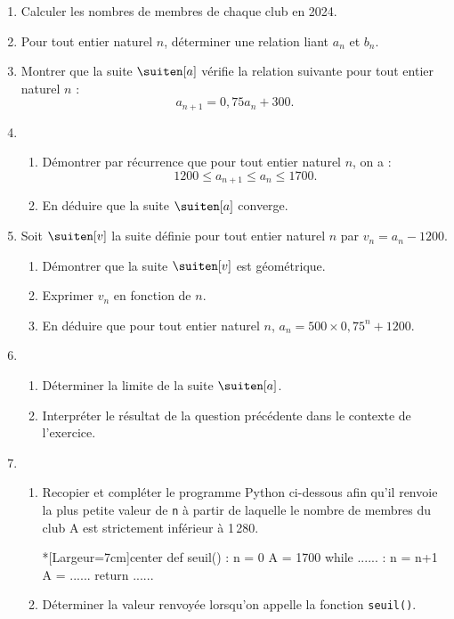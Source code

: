\begin{enumerate}
	\item Calculer les nombres de membres de chaque club en 2024.
	\item Pour tout entier naturel $n$, déterminer une relation liant $a_n$ et $b_n$.
	\item Montrer que la suite $\suiten[a]$ vérifie la relation suivante pour tout entier naturel $n$ : \[ a_{n+1}=0,75a_n+300. \]
	\item 
	\begin{enumerate}
		\item Démontrer par récurrence que pour tout entier naturel $n$, on a : \[ \num{1200} \leqslant a_{n+1} \leqslant a_n \leqslant \num{1700}. \]
		\item En déduire que la suite $\suiten[a]$ converge.
	\end{enumerate}
	\item Soit $\suiten[v]$ la suite définie pour tout entier naturel $n$ par $v_n = a_n - \num{1200}$.
	\begin{enumerate}
		\item Démontrer que la suite $\suiten[v]$ est géométrique.
		\item Exprimer $v_n$ en fonction de $n$.
		\item En déduire que pour tout entier naturel $n$, $a_n = 500 \times 0,75^n + \num{1200}$.
	\end{enumerate}
	\item 
	\begin{enumerate}
		\item Déterminer la limite de la suite $\suiten[a]$.
		\item Interpréter le résultat de la question précédente dans le contexte de l'exercice.
	\end{enumerate}
	\item 
	\begin{enumerate}
		\item Recopier et compléter le programme \textsf{Python} ci-dessous afin qu'il renvoie la plus petite valeur de \texttt{n} à partir de laquelle le nombre de membres du club A est strictement inférieur à 1\,280.

\begin{CodePythonLstAlt}*[Largeur=7cm]{center}
def seuil() :
	n = 0 
	A = 1700 
	while ...... :
		n = n+1
		A = ......
	return ......
\end{CodePythonLstAlt}
	\item Déterminer la valeur renvoyée lorsqu'on appelle la fonction \texttt{seuil()}. 
	\end{enumerate}
\end{enumerate}